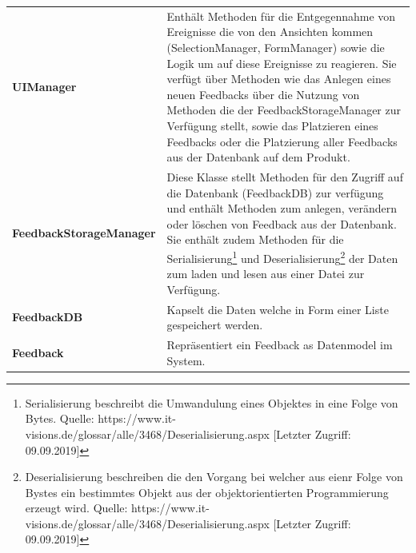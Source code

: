 \begin{tabularx}{\textwidth}{l X}
	\vspace{1mm}\textbf{UIManager} & Enthält Methoden für die Entgegennahme von Ereignisse die von den Ansichten kommen (SelectionManager, FormManager) sowie die Logik um auf diese Ereignisse zu reagieren. Sie verfügt über Methoden wie das Anlegen eines neuen Feedbacks über die Nutzung von Methoden die der FeedbackStorageManager zur Verfügung stellt, sowie das Platzieren eines Feedbacks oder die Platzierung aller Feedbacks aus der Datenbank auf dem Produkt. \\
	\vspace{1mm}\textbf{FeedbackStorageManager} & Diese Klasse stellt Methoden für den Zugriff auf die Datenbank (FeedbackDB) zur verfügung und enthält Methoden zum anlegen, verändern oder löschen von Feedback aus der Datenbank. Sie enthält zudem Methoden für die Serialisierung\footnote{Serialisierung  beschreibt die Umwandulung eines Objektes in eine Folge von Bytes. Quelle: https://www.it-visions.de/glossar/alle/3468/Deserialisierung.aspx [Letzter Zugriff: 09.09.2019]} und Deserialisierung\footnote{Deserialisierung beschreiben die den Vorgang bei welcher aus eienr Folge von Bystes ein bestimmtes Objekt aus der objektorientierten Programmierung erzeugt wird. Quelle: https://www.it-visions.de/glossar/alle/3468/Deserialisierung.aspx [Letzter Zugriff: 09.09.2019]} der Daten zum laden und lesen aus einer Datei zur Verfügung. \\
	\vspace{1mm}\textbf{FeedbackDB} & Kapselt die Daten welche in Form einer Liste gespeichert werden. \\
	\vspace{1mm}\textbf{Feedback} & Repräsentiert ein Feedback as Datenmodel im System.\\
\end{tabularx}
